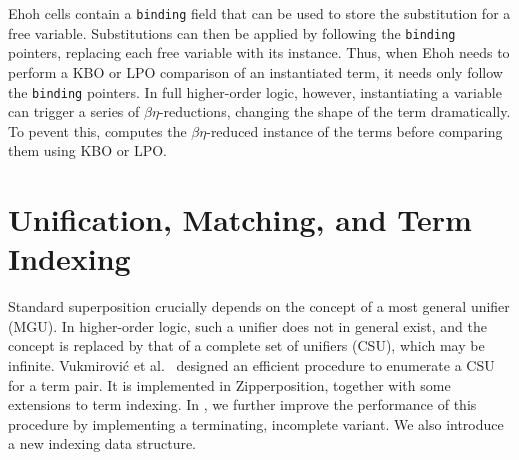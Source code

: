 Ehoh cells contain a \verb|binding| field that can be used to store the
substitution for a free variable. Substitutions can then be applied by following
the \texttt{binding} pointers, replacing each free variable with its instance.
Thus, when Ehoh needs to perform a KBO or LPO comparison of an instantiated term,
it needs only follow the \texttt{binding} pointers.
In full higher-order logic, however, instantiating a variable can trigger a
series of $\beta\eta$-reductions,
changing the shape of the term dramatically. To pevent this, \ehohii{}
computes the $\beta\eta$-reduced instance of the terms
before comparing them using KBO or LPO.

\section{Unification, Matching, and Term Indexing}
\label{sec:ehoh2:unif-match-index}

Standard superposition crucially depends on the concept of a most general unifier
(MGU).
In higher-order logic, such a unifier does not in general exist, and the concept
is replaced by that of a complete set of unifiers (CSU), which may be infinite.
Vukmirovi\'c et al.\ \cite{unif-section} designed an efficient
procedure to enumerate a CSU for a term pair. It is implemented in Zipperposition, together with some extensions to term indexing.
In \ehohii{}, we further improve the performance of this procedure by implementing a terminating,
incomplete variant. We also introduce a new indexing data structure.

